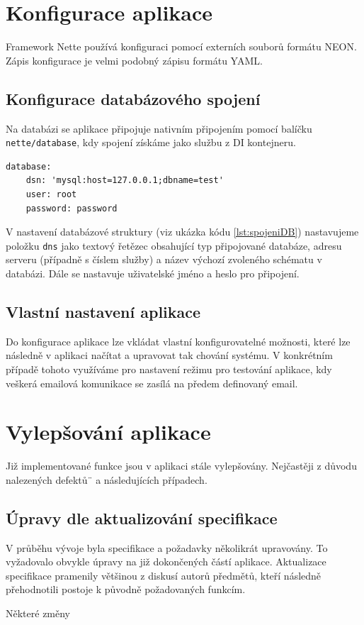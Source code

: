 \documentclass[czech,BP]{thesiskiv}
\begin{document}
	\section{Konfigurace aplikace}
	\par Framework Nette používá konfiguraci pomocí externích souborů formátu NEON. Zápis konfigurace je velmi podobný zápisu formátu YAML.
	\subsection{Konfigurace databázového spojení}
	\par Na databázi se aplikace připojuje nativním připojením pomocí balíčku \texttt{nette/database}, kdy spojení získáme jako službu z DI kontejneru.
	
	\begin{lstlisting}[caption={Konfigurace databázového spojení},label={lst:spojeniDB}]
database:
	dsn: 'mysql:host=127.0.0.1;dbname=test'
	user: root
	password: password
\end{lstlisting}
	\par V nastavení databázové struktury (viz ukázka kódu \ref{lst:spojeniDB}) nastavujeme položku \texttt{dns} jako textový řetězec obsahující typ připojované databáze, adresu serveru (případně s číslem služby) a název výchozí zvoleného schématu v databázi. Dále se nastavuje uživatelské jméno a heslo pro připojení.
	\subsection{Vlastní nastavení aplikace}
	\par Do konfigurace aplikace lze vkládat vlastní konfigurovatelné možnosti, které lze následně v aplikaci načítat a upravovat tak chování systému. V konkrétním případě tohoto využíváme pro nastavení režimu pro testování aplikace, kdy veškerá emailová komunikace se zasílá na předem definovaný email.
	\section{Vylepšování aplikace}
	\par Již implementované funkce jsou v aplikaci stále vylepšovány. Nejčastěji z důvodu nalezených defektů¨ a následujících případech.
	\subsection{Úpravy dle aktualizování specifikace}
	\par V průběhu vývoje byla specifikace a požadavky několikrát upravovány. To vyžadovalo obvykle úpravy na již dokončených částí aplikace. Aktualizace specifikace pramenily většinou z diskusí autorů předmětů, kteří následně přehodnotili postoje k původně požadovaných funkcím. 
	\par Některé změny 
\end{document}
